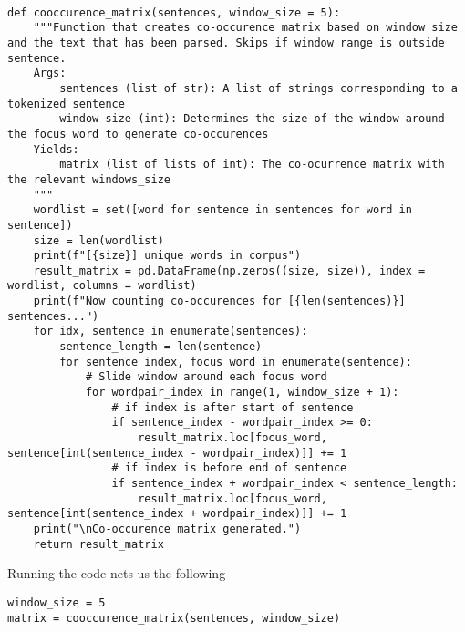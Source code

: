 \documentclass[12pt, letterpaper]{article}
\begin{document}
\begin{mdframed}[backgroundcolor=shadecolor]
\begin{verbatim}

def cooccurence_matrix(sentences, window_size = 5):
    """Function that creates co-occurence matrix based on window size and the text that has been parsed. Skips if window range is outside sentence.
    Args:
        sentences (list of str): A list of strings corresponding to a tokenized sentence
        window-size (int): Determines the size of the window around the focus word to generate co-occurences
    Yields:
        matrix (list of lists of int): The co-ocurrence matrix with the relevant windows_size
    """
    wordlist = set([word for sentence in sentences for word in sentence])
    size = len(wordlist)
    print(f"[{size}] unique words in corpus")
    result_matrix = pd.DataFrame(np.zeros((size, size)), index = wordlist, columns = wordlist)
    print(f"Now counting co-occurences for [{len(sentences)}] sentences...")
    for idx, sentence in enumerate(sentences):        
        sentence_length = len(sentence)
        for sentence_index, focus_word in enumerate(sentence):
            # Slide window around each focus word
            for wordpair_index in range(1, window_size + 1):
                # if index is after start of sentence
                if sentence_index - wordpair_index >= 0:
                    result_matrix.loc[focus_word, sentence[int(sentence_index - wordpair_index)]] += 1
                # if index is before end of sentence
                if sentence_index + wordpair_index < sentence_length:
                    result_matrix.loc[focus_word, sentence[int(sentence_index + wordpair_index)]] += 1
    print("\nCo-occurence matrix generated.")
    return result_matrix

\end{verbatim}
\end{mdframed}

Running the code nets us the following

\begin{mdframed}[backgroundcolor=shadecolor]
\begin{verbatim}
window_size = 5
matrix = cooccurence_matrix(sentences, window_size)
\end{verbatim}
\end{mdframed}
\end{document}
